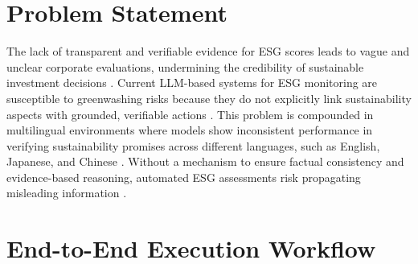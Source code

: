 \documentclass{article}
\begin{document}
\section{Problem Statement}
The lack of transparent and verifiable evidence for ESG scores leads to vague and unclear corporate evaluations, undermining the credibility of sustainable investment decisions \citep{cite_006}. Current LLM-based systems for ESG monitoring are susceptible to greenwashing risks because they do not explicitly link sustainability aspects with grounded, verifiable actions \citep{cite_011}. This problem is compounded in multilingual environments where models show inconsistent performance in verifying sustainability promises across different languages, such as English, Japanese, and Chinese \citep{cite_005}. Without a mechanism to ensure factual consistency and evidence-based reasoning, automated ESG assessments risk propagating misleading information \citep{cite_008, cite_004}.
\clearpage
\section{End-to-End Execution Workflow}
\end{document}
